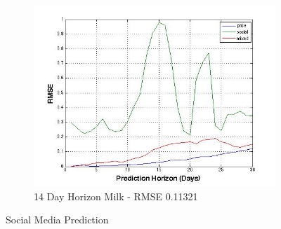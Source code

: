 \begin{figure}
        \begin{subfigure}[b]{0.5\textwidth}
                \includegraphics[width=\textwidth]{img/model/results/result_milk}
                \caption{14 Day Horizon Milk - RMSE 0.11321  }
                \label{fig:tiger}
         \end{subfigure}%
         
        \caption{Social Media Prediction}\label{fig:final_res}
\end{figure}


